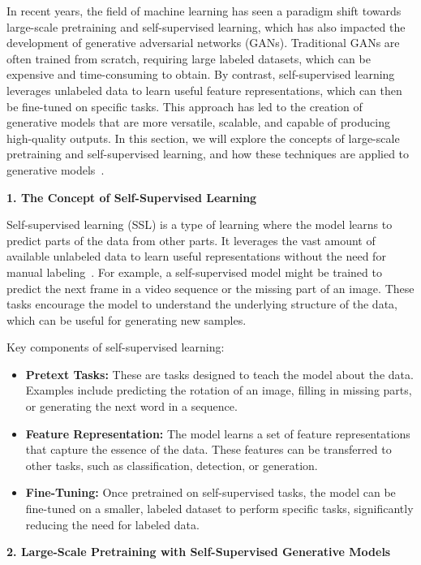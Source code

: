 In recent years, the field of machine learning has seen a paradigm shift towards large-scale pretraining and self-supervised learning, which has also impacted the development of generative adversarial networks (GANs). Traditional GANs are often trained from scratch, requiring large labeled datasets, which can be expensive and time-consuming to obtain. By contrast, self-supervised learning leverages unlabeled data to learn useful feature representations, which can then be fine-tuned on specific tasks. This approach has led to the creation of generative models that are more versatile, scalable, and capable of producing high-quality outputs. In this section, we will explore the concepts of large-scale pretraining and self-supervised learning, and how these techniques are applied to generative models~\cite{de2021survey}.

\textbf{1. The Concept of Self-Supervised Learning}

Self-supervised learning (SSL) is a type of learning where the model learns to predict parts of the data from other parts. It leverages the vast amount of available unlabeled data to learn useful representations without the need for manual labeling~\cite{zhang2019self}. For example, a self-supervised model might be trained to predict the next frame in a video sequence or the missing part of an image. These tasks encourage the model to understand the underlying structure of the data, which can be useful for generating new samples.

Key components of self-supervised learning:
\begin{itemize}
    \item \textbf{Pretext Tasks:} These are tasks designed to teach the model about the data. Examples include predicting the rotation of an image, filling in missing parts, or generating the next word in a sequence.
    \item \textbf{Feature Representation:} The model learns a set of feature representations that capture the essence of the data. These features can be transferred to other tasks, such as classification, detection, or generation.
    \item \textbf{Fine-Tuning:} Once pretrained on self-supervised tasks, the model can be fine-tuned on a smaller, labeled dataset to perform specific tasks, significantly reducing the need for labeled data.
\end{itemize}

\textbf{2. Large-Scale Pretraining with Self-Supervised Generative Models}

